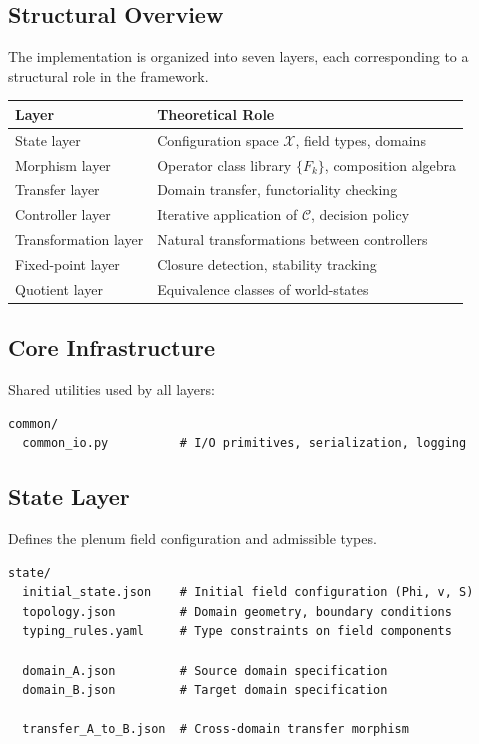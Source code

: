 \documentclass[12pt, oneside]{article}
\begin{document}
\subsection{Structural Overview}

The implementation is organized into seven layers, each corresponding to a structural
role in the framework.

\begin{center}
\begin{tabular}{ll}
\toprule
\textbf{Layer} & \textbf{Theoretical Role} \\
\midrule
State layer & Configuration space $\mathcal{X}$, field types, domains \\
Morphism layer & Operator class library $\{F_k\}$, composition algebra \\
Transfer layer & Domain transfer, functoriality checking \\
Controller layer & Iterative application of $\mathcal{C}$, decision policy \\
Transformation layer & Natural transformations between controllers \\
Fixed-point layer & Closure detection, stability tracking \\
Quotient layer & Equivalence classes of world-states \\
\bottomrule
\end{tabular}
\end{center}

\subsection{Core Infrastructure}

Shared utilities used by all layers:
\begin{verbatim}
common/
  common_io.py          # I/O primitives, serialization, logging
\end{verbatim}

\subsection{State Layer}

Defines the plenum field configuration and admissible types.
\begin{verbatim}
state/
  initial_state.json    # Initial field configuration (Phi, v, S)
  topology.json         # Domain geometry, boundary conditions
  typing_rules.yaml     # Type constraints on field components

  domain_A.json         # Source domain specification
  domain_B.json         # Target domain specification

  transfer_A_to_B.json  # Cross-domain transfer morphism
\end{verbatim}
\end{document}
